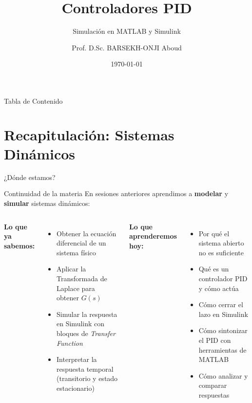 \documentclass[aspectratio=169,xcolor=dvipsnames]{beamer}
\title{Controladores PID}
\subtitle{Simulación en MATLAB y Simulink}
\author{Prof. D.Sc. BARSEKH-ONJI Aboud}
\institute{
    Facultad de Ingeniería \\
    Universidad Anáhuac México
}
\date{\today}
\begin{document}
\begin{frame}
    \titlepage
\end{frame}

\begin{frame}{Tabla de Contenido}
    \tableofcontents
\end{frame}

\section{Recapitulación: Sistemas Dinámicos}

\begin{frame}{¿Dónde estamos?}
    \footnotesize
    \begin{block}{Continuidad de la materia}
        En sesiones anteriores aprendimos a \textbf{modelar} y \textbf{simular} sistemas dinámicos:
    \end{block}
    \vspace{0.4em}
    \begin{columns}
        \textbf{Lo que ya sabemos:}
        \begin{itemize}
            \item Obtener la ecuación diferencial de un sistema físico
            \item Aplicar la Transformada de Laplace para obtener $G(s)$
            \item Simular la respuesta en Simulink con bloques de \textit{Transfer Function}
            \item Interpretar la respuesta temporal (transitorio y estado estacionario)
        \end{itemize}
        \textbf{Lo que aprenderemos hoy:}
        \begin{itemize}
            \item Por qué el sistema abierto no es suficiente
            \item Qué es un controlador PID y cómo actúa
            \item Cómo cerrar el lazo en Simulink
            \item Cómo sintonizar el PID con herramientas de MATLAB
            \item Cómo analizar y comparar respuestas
        \end{itemize}
    \end{columns}
\end{frame}
\end{document}

